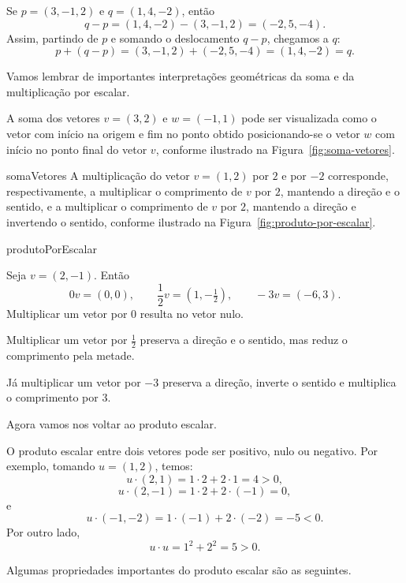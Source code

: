 \begin{example}
    Se $p=(3,-1,2)$ e $q=(1,4,-2)$, então
    \[
        q-p=(1,4,-2)-(3,-1,2)=(-2,5,-4).
    \]
    Assim, partindo de $p$ e somando o deslocamento $q-p$, chegamos a $q$:
    \[
        p+(q-p)
        =(3,-1,2)+(-2,5,-4)
        =(1,4,-2)
        =q.
    \]
\end{example}

Vamos lembrar de importantes interpretações geométricas da soma e da multiplicação por escalar.

A soma dos vetores $v=(3, 2)$ e $w=(-1, 1)$ pode ser visualizada como o vetor com início na origem e fim no ponto obtido posicionando-se o vetor $w$ com início no ponto final do vetor $v$, conforme ilustrado na Figura~\ref{fig:soma-vetores}.

{somaVetores}
A multiplicação do vetor $v=(1, 2)$ por $2$ e por $-2$ corresponde, respectivamente, a multiplicar o comprimento de $v$ por $2$, mantendo a direção e o sentido, e a multiplicar o comprimento de $v$ por $2$, mantendo a direção e invertendo o sentido, conforme ilustrado na Figura~\ref{fig:produto-por-escalar}.

{produtoPorEscalar}

\begin{example}
    Seja $v=(2,-1)$. Então
    \[
        0v=(0,0),
        \qquad
        \frac12v=(1,-\tfrac12),
        \qquad
        -3v=(-6,3).
    \]
    Multiplicar um vetor por $0$ resulta no vetor nulo.
    
    Multiplicar um vetor por $\frac12$ preserva a direção e o sentido, mas reduz o comprimento pela metade.
    
    Já multiplicar um vetor por $-3$ preserva a direção, inverte o sentido e multiplica o comprimento por $3$.
\end{example}

Agora vamos nos voltar ao produto escalar.

\begin{example}
    O produto escalar entre dois vetores pode ser positivo, nulo ou negativo.
    Por exemplo, tomando $u=(1,2)$, temos:
    \[
        u\cdot(2,1)=1\cdot2+2\cdot1=4>0,
    \]
    \[
        u\cdot(2,-1)=1\cdot2+2\cdot(-1)=0,
    \]
    e
    \[
        u\cdot(-1,-2)=1\cdot(-1)+2\cdot(-2)=-5<0.
    \]
    Por outro lado,
    \[
        u\cdot u=1^2+2^2=5>0.
    \]
\end{example}

Algumas propriedades importantes do produto escalar são as seguintes.

